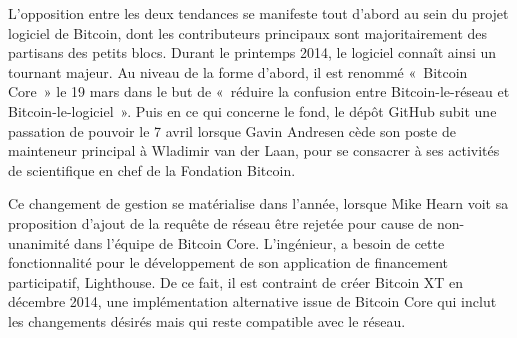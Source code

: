 L'opposition entre les deux tendances se manifeste tout d'abord au sein du projet logiciel de Bitcoin, dont les contributeurs principaux sont majoritairement des partisans des petits blocs. Durant le printemps 2014, le logiciel connaît ainsi un tournant majeur. Au niveau de la forme d'abord, il est renommé «~Bitcoin Core~» le 19 mars dans le but de «~réduire la confusion entre Bitcoin-le-réseau et Bitcoin-le-logiciel~». Puis en ce qui concerne le fond, le dépôt GitHub subit une passation de pouvoir le 7 avril lorsque Gavin Andresen cède son poste de mainteneur principal à Wladimir van der Laan, pour se consacrer à ses activités de scientifique en chef de la Fondation Bitcoin.

Ce changement de gestion se matérialise dans l'année, lorsque Mike Hearn voit sa proposition d'ajout de la requête de réseau  être rejetée pour cause de non-unanimité dans l'équipe de Bitcoin Core. L'ingénieur, a besoin de cette fonctionnalité pour le développement de son application de financement participatif, Lighthouse. De ce fait, il est contraint de créer Bitcoin XT en décembre 2014, une implémentation alternative issue de Bitcoin Core qui inclut les changements désirés mais qui reste compatible avec le réseau.

